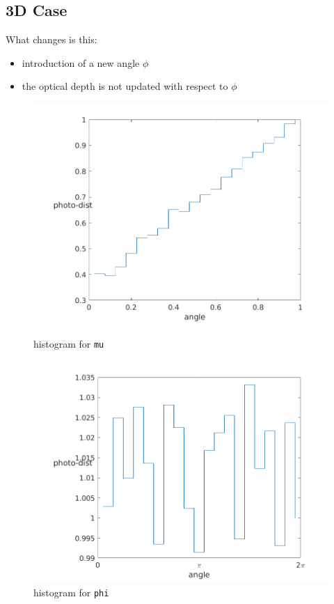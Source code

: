 \documentclass[../main/main.tex]{subfiles}
\begin{document}
\newpage
\subsection{3D Case}
\label{3D_limb_darkening}

What changes is this: 
\begin{itemize}
\item introduction of a new angle $\phi$
\item the optical depth is not updated with respect to $\phi$ 
\end{itemize}


\begin{figure}[!htp]
\centering
\begin{minipage}{.5\textwidth}
\includegraphics[width=\textwidth]{../../introductory_exercises/limb_darkening/data/LD_3D_mu_number_channels20number_photons100000max_opt_depth10.png}
\caption{histogram for \texttt{mu}}
\label{3D_mu}
\end{minipage}%
\begin{minipage}{.5\textwidth}
\includegraphics[width=\textwidth]{../../introductory_exercises/limb_darkening/data/LD_3D_phi_number_channels20number_photons100000max_opt_depth10.png}
\caption{histogram for \texttt{phi}}
\label{3D_phi}
\end{minipage}
\end{figure}
\end{document}
